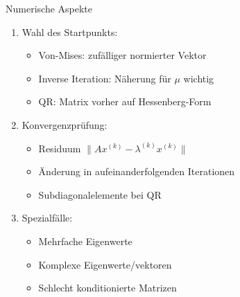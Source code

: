 \begin{remark2}{Numerische Aspekte}
\begin{enumerate}
    \item Wahl des Startpunkts:
    \begin{itemize}
        \item Von-Mises: zufälliger normierter Vektor
        \item Inverse Iteration: Näherung für $\mu$ wichtig
        \item QR: Matrix vorher auf Hessenberg-Form
    \end{itemize}
    
    \item Konvergenzprüfung:
    \begin{itemize}
        \item Residuum $\|Ax^{(k)} - \lambda^{(k)}x^{(k)}\|$
        \item Änderung in aufeinanderfolgenden Iterationen
        \item Subdiagonalelemente bei QR
    \end{itemize}
    
    \item Spezialfälle:
    \begin{itemize}
        \item Mehrfache Eigenwerte
        \item Komplexe Eigenwerte/vektoren
        \item Schlecht konditionierte Matrizen
    \end{itemize}
\end{enumerate}
\end{remark2}